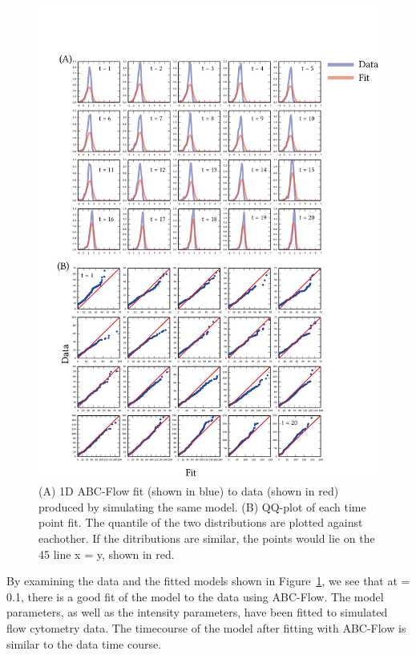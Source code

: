 \begin{figure}[htbp]
\centering
	\includegraphics[scale=0.8]{chapterABCFlow/images/1D_sim_res.png}
	\caption[LoF caption]{\label{fig:1d-sim-res} (A) 1D ABC-Flow fit (shown in blue) to data (shown in red) produced by simulating the same model. (B) QQ-plot of each time point fit. The quantile of the two distributions are plotted against eachother. If the ditributions are similar, the points would lie on the 45\textdegree{} line x = y, shown in red. }
\end{figure}
\clearpage

By examining the data and the fitted models shown in Figure~\ref{fig:1d-sim-res}, we see that at \textepsilon = 0.1, there is a good fit of the model to the data using ABC-Flow. The model parameters, as well as the intensity parameters, have been fitted to simulated flow cytometry data. The timecourse of the model after fitting with ABC-Flow is similar to the data time course. 

